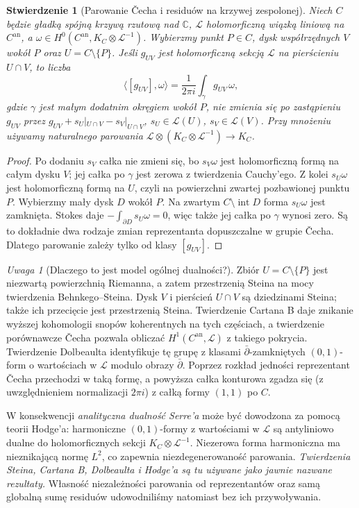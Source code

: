 \documentclass[11pt,a4paper,openany]{report}
\numberwithin{equation}{section}
\theoremstyle{plain}
\newtheorem{stwierdzenie}[twierdzenie]{Stwierdzenie}
\theoremstyle{definition}
\theoremstyle{remark}
\newtheorem{uwaga}[twierdzenie]{Uwaga}
\newcommand{\C}{\mathbb C}
\begin{document}
\begin{stwierdzenie}[Parowanie Čecha i residuów na krzywej zespolonej]
\label{st:cech-res-pairing}
Niech $C$ będzie gładką spójną krzywą rzutową nad $\C$,
$\mathcal L$ holomorficzną wiązką liniową na $C^{\mathrm{an}}$,
a $\omega\in H^0(C^{\mathrm{an}},K_C\otimes\mathcal L^{-1})$.
Wybierzmy punkt $P\in C$, dysk współrzędnych $V$
wokół $P$ oraz $U=C\setminus\{P\}$.
Jeśli $g_{UV}$ jest holomorficzną sekcją $\mathcal L$
na pierścieniu $U\cap V$, to liczba
\[
\langle[g_{UV}],\omega\rangle
 =\frac1{2\pi i}\int_{\gamma}g_{UV}\,\omega,
\]
gdzie $\gamma$ jest małym dodatnim okręgiem wokół $P$,
nie zmienia się po zastąpieniu $g_{UV}$ przez
$g_{UV}+s_U|_{U\cap V}-s_V|_{U\cap V}$,
$s_U\in\mathcal L(U)$, $s_V\in\mathcal L(V)$.
Przy mnożeniu używamy naturalnego parowania
$\mathcal L\otimes (K_C\otimes\mathcal L^{-1})\to K_C$.
\end{stwierdzenie}
\begin{proof}
Po dodaniu $s_V$ całka nie zmieni się, bo
$s_V\omega$ jest holomorficzną formą na całym dysku
$V$; jej całka po $\gamma$ jest zerowa z twierdzenia
Cauchy'ego. Z kolei $s_U\omega$ jest holomorficzną
formą na $U$, czyli na powierzchni zwartej pozbawionej
punktu $P$. Wybierzmy mały dysk $D$ wokół $P$.
Na zwartym $C\setminus\operatorname{int}D$
forma $s_U\omega$ jest zamknięta. Stokes daje
$-\int_{\partial D}s_U\omega=0$, więc także
jej całka po $\gamma$ wynosi zero. Są to dokładnie
dwa rodzaje zmian reprezentanta dopuszczalne
w grupie Čecha. Dlatego parowanie zależy tylko
od klasy $[g_{UV}]$.
\end{proof}

\begin{uwaga}[Dlaczego to jest model ogólnej dualności?]
Zbiór $U=C\setminus\{P\}$ jest niezwartą powierzchnią
Riemanna, a zatem przestrzenią Steina na mocy twierdzenia
Behnkego--Steina. Dysk $V$ i pierścień $U\cap V$
są dziedzinami Steina;
także ich przecięcie jest przestrzenią Steina.
Twierdzenie Cartana B daje znikanie wyższej
kohomologii snopów koherentnych na tych częściach,
a twierdzenie porównawcze Čecha pozwala obliczać
$H^1(C^{\mathrm{an}},\mathcal L)$ z takiego pokrycia.
Twierdzenie Dolbeaulta identyfikuje tę grupę
z klasami $\bar\partial$-zamkniętych $(0,1)$-form
o wartościach w $\mathcal L$ modulo obrazy $\bar\partial$.
Poprzez rozkład jedności reprezentant Čecha
przechodzi w taką formę, a powyższa całka konturowa
zgadza się (z uwzględnieniem normalizacji $2\pi i$)
z całką formy $(1,1)$ po $C$.

W konsekwencji \emph{analityczna dualność Serre'a}
może być dowodzona za pomocą teorii Hodge'a:
harmoniczne $(0,1)$-formy z wartościami w
$\mathcal L$ są antyliniowo dualne do
holomorficznych sekcji $K_C\otimes\mathcal L^{-1}$.
Niezerowa forma harmoniczna ma nieznikającą normę
$L^2$, co zapewnia niezdegenerowaność parowania.
\emph{Twierdzenia Steina, Cartana B, Dolbeaulta i Hodge'a
są tu używane jako jawnie nazwane rezultaty.}
Własność niezależności parowania od reprezentantów
oraz samą globalną sumę residuów udowodniliśmy
natomiast bez ich przywoływania.
\end{uwaga}
\end{document}

